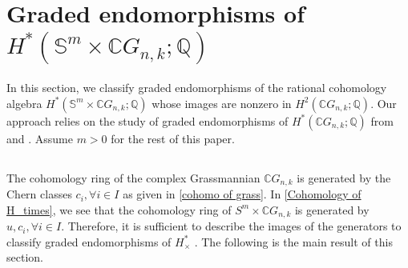 \documentclass{amsart}
\begin{document}
	
	
	
	
	
	
	
	
	
	\section{Graded endomorphisms of $H^*(\mathbb S^m\times \mathbb CG_{n,k};\mathbb Q)$} \label{section 3}
	
	In this section, we classify graded endomorphisms of the rational cohomology algebra $ H^*(\mathbb S^m\times \mathbb CG_{n,k}; \mathbb{Q}) $ whose images are nonzero in $H^2(\mathbb CG_{n,k};\mathbb Q)$. Our approach relies on the study of graded endomorphisms of $ H^*(\mathbb{C}G_{n,k}; \mathbb{Q}) $ from \cite{glover-homer} and \cite{hoffman}. Assume $m>0$ for the rest of this paper.
	\subsection{} The cohomology ring of the complex Grassmannian $ \mathbb{C}G_{n,k} $ is generated by the Chern classes $c_i,\forall i \in I $ as given in \eqref{cohomo of grass}. In \eqref{Cohomology of H_times}, we see that the cohomology ring of $S^m \times \mathbb{C}G_{n,k}$ is generated by $u, c_i, \forall i \in I$. Therefore, it is sufficient to describe the images of the generators to classify graded endomorphisms of $H_{\times}^*$%
. The following is %
the main result of this section.
	
	
	
	
	
	
	
\end{document}
